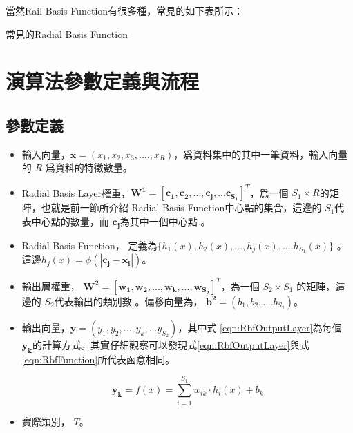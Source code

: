 當然Rail Basis Function有很多種，常見的如下表所示：
\\

\begin{table}[h!]
	\centering
	\label{tab:rbf_table}
	
	\caption{常見的Radial Basis Function}
\end{table}






\section{演算法參數定義與流程}




\subsection{參數定義}
\begin{itemize}
	\item
	      輸入向量，\(\mathbf{x} = (x_1,x_2,x_3,....,x_R)\)，爲資料集中的其中一筆資料，輸入向量的 \(R\) 爲資料的特徵數量。
	\item
	      Radial Basis Layer權重，\(\mathbf{W^1} = [\mathbf{c_1,c_2,...,c_j,...c_{S_1}}]^T\)，爲一個 \(S_1 \times R \)的矩陣，也就是前一節所介紹 Radial Basis Function中心點的集合，這邊的 \(S_1\)代表中心點的數量，而 \(\mathbf{c_j}\)為其中一個中心點 。
	\item
	      Radial Basis Function， 定義為\(\{h_1(x), h_2(x),...,h_j(x),....h_{S_1}(x) \}\)  。
	      這邊$h_j(x)=\phi(\mathbf{|c_j-x_i|})$。


	\item
	      輸出層權重， \(\mathbf{W^2}= [\mathbf{w_1,w_2,...,w_k,...,w_{S_2}}]^T\)，為一個 \(S_2 \times S_1\) 的矩陣，這邊的 \(S_2\)代表輸出的類別數 。偏移向量為， \(\mathbf{b^2}=(b_1,b_2,....b_{S_2})\)。
	\item
	      輸出向量，\(\mathbf{y}= (y_1,y_2,...,y_k,...y_{S_2})\)，其中式 \ref{eqn:RbfOutputLayer}為每個 \(\mathbf{y_k}\)的計算方式。其實仔細觀察可以發現式\ref{eqn:RbfOutputLayer}與式\ref{eqn:RbfFunction}所代表函意相同。

	      \begin{equation}
		      \label{eqn:RbfOutputLayer}
		      \mathbf{y_k}= f(x) = \sum_{i=1}^{S_1}w_{ik}\cdot h_i(x)+b_k
	      \end{equation}
	\item
	      實際類別， \(T\)。
\end{itemize}


